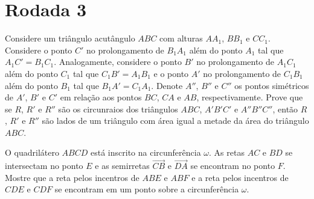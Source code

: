 \documentclass[12pt, a4paper]{article}
\begin{document}
	\section{Rodada 3}

	\begin{prob}[Bulgária 2013]
		Considere um triângulo acutângulo $ABC$ com alturas $AA_1$, $BB_1$ e $CC_1$. Considere o ponto $C'$ no prolongamento de $B_1A_1$ além do ponto $A_1$ tal que $A_1C' = B_1C_1$. Analogamente, considere o ponto $B'$ no prolongamento de $A_1C_1$ além do ponto $C_1$ tal que $C_1B' = A_1B_1$ e o ponto $A'$ no prolongamento de $C_1B_1$ além do ponto $B_1$ tal que $B_1A' = C_1A_1$. Denote $A''$, $B''$ e $C''$ os pontos simétricos de $A'$, $B'$ e $C'$ em relação aos pontos $BC$, $CA$ e $AB$, respectivamente. Prove que se $R$, $R'$ e $R''$ são os circunraios dos triângulos $ABC$, $A'B'C'$ e $A''B''C''$, então $R$, $R'$ e $R''$ são lados de um triângulo com área igual a metade da área do triângulo $ABC$.
	\end{prob}
	\begin{prob}[Bulgária 2014]
		O quadrilátero $ABCD$ está inscrito na circunferência $\omega$. As retas $AC$ e $BD$ se intersectam no ponto  $E$ e as semirretas $\overrightarrow{CB}$ e  $\overrightarrow{DA}$ se encontram no ponto $F$. Mostre que a reta pelos incentros de $ABE$ e $ABF$ e a reta pelos incentros de $CDE$ e $CDF$ se encontram em um ponto sobre a circunferência $\omega$.
	\end{prob}
\end{document}
